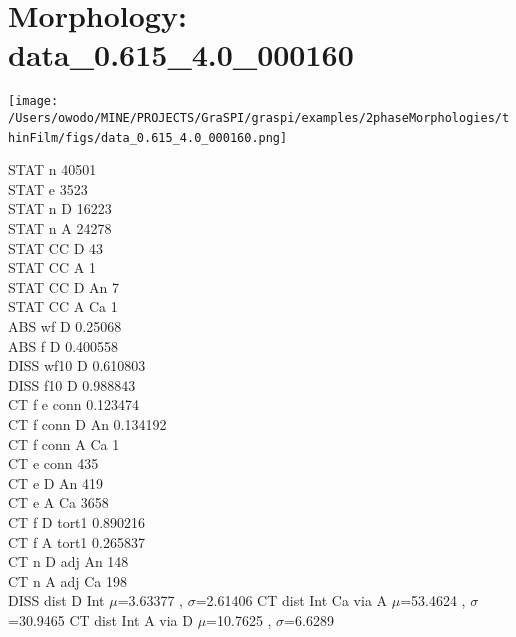 \documentclass{article}
\begin{document}
\section{Morphology: data\_0.615\_4.0\_000160 }
\parbox{0.35\textwidth}{
\texttt{[image: /Users/owodo/MINE/PROJECTS/GraSPI/graspi/examples/2phaseMorphologies/thinFilm/figs/data\_0.615\_4.0\_000160.png]} \  
 ~\newline ~\newline 
\begin{small}
STAT n 40501\\
STAT e 3523\\
STAT n D 16223\\
STAT n A 24278\\
STAT CC D 43\\
STAT CC A 1\\
STAT CC D An 7\\
STAT CC A Ca 1\\
ABS wf D 0.25068\\
ABS f D 0.400558\\
DISS wf10 D 0.610803\\
DISS f10 D 0.988843\\
CT f e conn 0.123474\\
CT f conn D An 0.134192\\
CT f conn A Ca 1\\
CT e conn 435\\
CT e D An 419\\
CT e A Ca 3658\\
CT f D tort1 0.890216\\
CT f A tort1 0.265837\\
CT n D adj An 148\\
CT n A adj Ca 198\\

DISS dist D Int $\mu$=3.63377 , $\sigma$=2.61406 \newline
CT dist Int Ca via A $\mu$=53.4624 , $\sigma$=30.9465 \newline
CT dist Int A via D $\mu$=10.7625 , $\sigma$=6.6289 \newline
\end{small}
}
\end{document}

